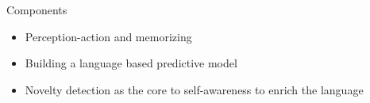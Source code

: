 \begin{frame}{Components}
    \begin{itemize}
        \item Perception-action and memorizing
        \item Building a language based predictive model
        \item Novelty detection as the core to self-awareness to enrich the language
    \end{itemize}
\end{frame}